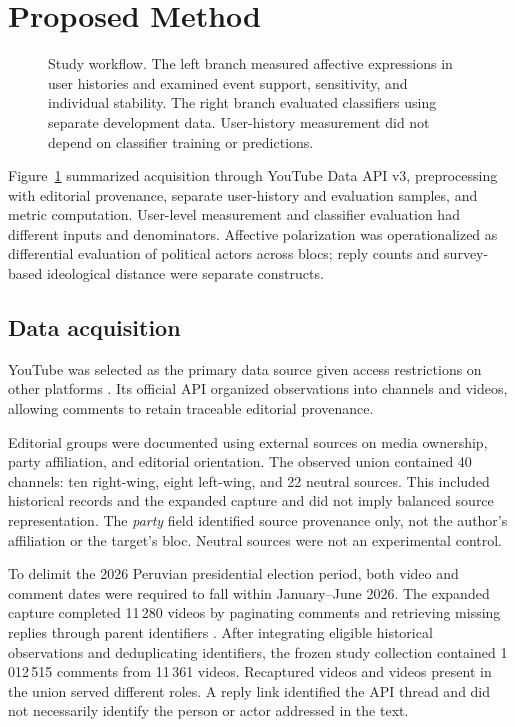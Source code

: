 \documentclass[conference, letterpaper]{IEEEtran}
\begin{document}
\section{Proposed Method}

\begin{figure}[t]
\centering
\resizebox{0.95\textwidth}{!}{}
\caption{Study workflow. The left branch measured affective expressions in user histories and examined event support, sensitivity, and individual stability. The right branch evaluated classifiers using separate development data. User-history measurement did not depend on classifier training or predictions.}
\label{fig:metodo}
\end{figure}

Figure~\ref{fig:metodo} summarized acquisition through YouTube Data API v3, preprocessing with editorial provenance, separate user-history and evaluation samples, and metric computation. User-level measurement and classifier evaluation had different inputs and denominators. Affective polarization was operationalized as differential evaluation of political actors across blocs; reply counts and survey-based ideological distance were separate constructs.

\subsection{Data acquisition}

YouTube was selected as the primary data source given access restrictions on other platforms \cite{ANTONAKAKI2021114006}. Its official API organized observations into channels and videos, allowing comments to retain traceable editorial provenance.

Editorial groups were documented using external sources on media ownership, party affiliation, and editorial orientation. The observed union contained 40 channels: ten right-wing, eight left-wing, and 22 neutral sources. This included historical records and the expanded capture and did not imply balanced source representation. The \textit{party} field identified source provenance only, not the author's affiliation or the target's bloc. Neutral sources were not an experimental control.

To delimit the 2026 Peruvian presidential election period, both video and comment dates were required to fall within January--June 2026. The expanded capture completed 11\,280 videos by paginating comments and retrieving missing replies through parent identifiers \cite{YoutubeThreads}. After integrating eligible historical observations and deduplicating identifiers, the frozen study collection contained 1\,012\,515 comments from 11\,361 videos. Recaptured videos and videos present in the union served different roles. A reply link identified the API thread and did not necessarily identify the person or actor addressed in the text.
 
\end{document}
